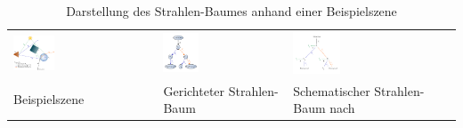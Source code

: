 \begin{table}[H]
    \centering
    \caption{Darstellung des Strahlen-Baumes anhand einer
        Beispielszene}\label{table:ray_tracing:ray_tree}
    \begin{tabular}{p{}p{}p{}}
        \toprule
            \includegraphics[width=0.3\textwidth]{img/ray_tracing_scene_ray_tree.pdf} &
            \includegraphics[width=0.3\textwidth]{img/ray_tracing_tree.pdf} &
            \includegraphics[width=0.3\textwidth]{img/ray_tracing_tree_schematic.pdf} \\
            Beispielszene &
            Gerichteter Strahlen-Baum &
            Schematischer Strahlen-Baum
            nach~\citeauthor{glassner_introduction_1989}\protect\footnotemark{} \\
        \bottomrule
    \end{tabular}
\end{table}

